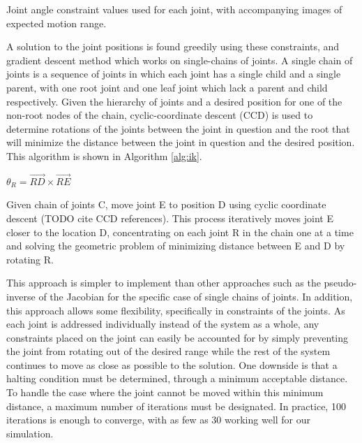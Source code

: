 \begin{table}[ht]
	\centering
	\caption[Table of joint constraints]{Joint angle constraint values used for each joint, with accompanying images of expected motion range.}
	\label{tab:jointConstraints}
\end{table}

A solution to the joint positions is found greedily using these constraints, and gradient descent method which works on single-chains of joints.  A single chain of joints is a sequence of joints in which each joint has a single child and a single parent, with one root joint and one leaf joint which lack a parent and child respectively.  Given the hierarchy of joints and a desired position for one of the non-root nodes of the chain, cyclic-coordinate descent (CCD) is used to determine rotations of the joints between the joint in question and the root that will minimize the distance between the joint in question and the desired position.  This algorithm is shown in Algorithm \ref{alg:ik}.

\begin{algorithm}[ht]
	\centering
	\begin{algorithmic}[H]
		\Repeat
			\State $\theta_R = \vec{RD} \times \vec{RE}$
		\EndFor
		\EndFunction
	\end{algorithmic}
	\caption[Single chain IK algorithm]{Given chain of joints C, move joint E to position D using cyclic coordinate descent (TODO cite CCD references).  This process iteratively moves joint E closer to the location D, concentrating on each joint R in the chain one at a time and solving the geometric problem of minimizing distance between E and D by rotating R.}
	\label{alg:ik}
\end{algorithm}

This approach is simpler to implement than other approaches such as the pseudo-inverse of the Jacobian for the specific case of single chains of joints.  In addition, this approach allows some flexibility, specifically in constraints of the joints.  As each joint is addressed individually instead of the system as a whole, any constraints placed on the joint can easily be accounted for by simply preventing the joint from rotating out of the desired range while the rest of the system continues to move as close as possible to the solution.  One downside is that a halting condition must be determined, through a minimum acceptable distance.  To handle the case where the joint cannot be moved within this minimum distance, a maximum number of iterations must be designated.  In practice, 100 iterations is enough to converge, with as few as 30 working well for our simulation.

